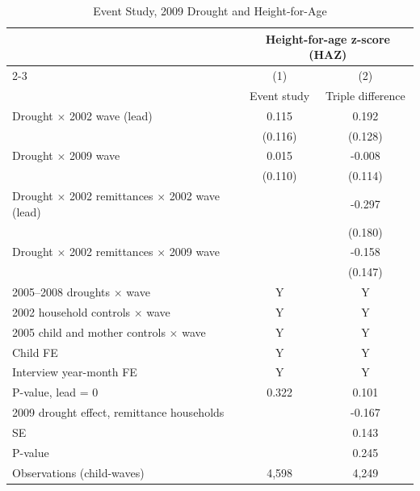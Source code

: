 \documentclass[12pt]{article}
\begin{document}
\begin{longtable}{l*{2}{c}}
\caption{Event Study, 2009 Drought and Height-for-Age}\\
\toprule
 & \multicolumn{2}{c}{Height-for-age z-score (HAZ)}\\
\cmidrule(lr){2-3}
            &\multicolumn{1}{c}{(1)}&\multicolumn{1}{c}{(2)}\\
            &\multicolumn{1}{c}{Event study}&\multicolumn{1}{c}{Triple difference}\\
\midrule
Drought \ensuremath{\times} 2002 wave (lead)&       0.115         &       0.192         \\
            &     (0.116)         &     (0.128)         \\
Drought \ensuremath{\times} 2009 wave&       0.015         &      -0.008         \\
            &     (0.110)         &     (0.114)         \\
Drought \ensuremath{\times} 2002 remittances \ensuremath{\times} 2002 wave (lead)&                     &      -0.297         \\
            &                     &     (0.180)         \\
Drought \ensuremath{\times} 2002 remittances \ensuremath{\times} 2009 wave&                     &      -0.158         \\
            &                     &     (0.147)         \\
\midrule
2005--2008 droughts \ensuremath{\times} wave&           Y         &           Y         \\
2002 household controls \ensuremath{\times} wave&           Y         &           Y         \\
2005 child and mother controls \ensuremath{\times} wave&           Y         &           Y         \\
Child FE    &           Y         &           Y         \\
Interview year-month FE&           Y         &           Y         \\
P-value, lead = 0&       0.322         &       0.101         \\
\midrule 2009 drought effect, remittance households&                     &      -0.167         \\
\quad SE    &                     &       0.143         \\
\quad P-value&                     &       0.245         \\
\midrule Observations (child-waves)&       4,598         &       4,249         \\

\end{longtable}
\end{document}
